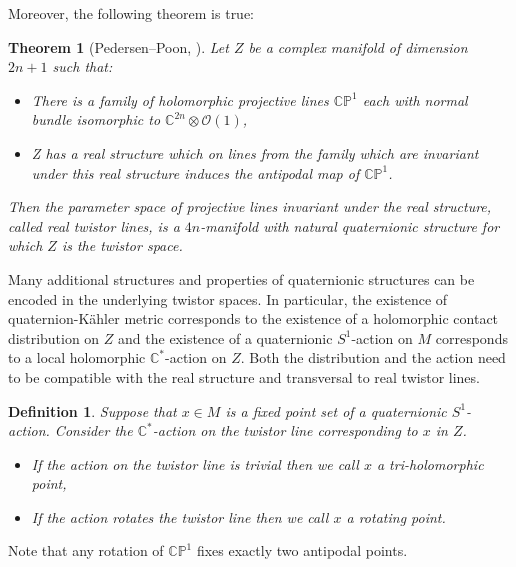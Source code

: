 \documentclass{amsart}
\newtheorem{thm}{Theorem}[section]
\newtheorem{defi}{Definition}[section]
\begin{document}
Moreover, the following theorem is true:
\begin{thm}[Pedersen--Poon, \cite{PP}] \label{TwSal}
Let $Z$ be a complex manifold of dimension $2n+1$ such that:
\begin{itemize}
\item[(i)]There is a family of holomorphic projective lines $\mathbb{C}\mathbb{P}^1$ each with normal bundle isomorphic to $\mathbb{C}^{2n}\otimes\mathcal{O}(1)$,
\item[(ii)]Z has a real structure which on lines from the family which are invariant under this real structure induces the antipodal map of $\mathbb{C}\mathbb{P}^1$.
\end{itemize}
Then the parameter space of projective lines invariant under the real structure, called real twistor lines, is a $4n$-manifold with natural quaternionic structure for which $Z$ is the twistor space.
\end{thm}
Many additional structures and properties of quaternionic structures can be encoded in the underlying twistor spaces. In particular, the existence of quaternion-K\"ahler metric corresponds to the existence of a holomorphic contact distribution on $Z$ and the existence of a quaternionic $S^1$-action on $M$ corresponds to a local holomorphic $\mathbb{C}^*$-action on $Z$. Both the distribution and the action need to be compatible with the real structure and  transversal to real twistor lines.
 \begin{defi}
 Suppose that $x\in M$ is a fixed point set of a quaternionic $S^1$-action. Consider the $\mathbb{C}^*$-action on the twistor line corresponding to $x$ in $Z$.
 \begin{itemize}
     \item If the action on the twistor line is trivial then we call $x$ a tri-holomorphic point,
     \item If the action rotates the twistor line then we call $x$ a rotating point.
 \end{itemize} 
 \end{defi}
 Note that any rotation of $\mathbb{CP}^1$ fixes exactly two antipodal points. 
 
\end{document}

